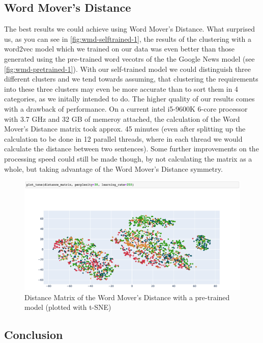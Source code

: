 \subsection{Word Mover's Distance} %
\label{sub:findings_wmd}
The best results we could achieve using Word Mover's Distance. What surprised us, as you can see in \autoref{fig:wmd-selftrained-1}, the results of the clustering with a word2vec model which we trained on our data was even better than those generated using the pre-trained word vecotrs of the the Google News model (see \autoref{fig:wmd-pretrained-1}). With our self-trained model we could distinguish three different clusters and we tend towards assuming, that clustering the requirements into these three clusters may even be more accurate than to sort them in 4 categories, as we initally intended to do.
The higher quality of our results comes with a drawback of performance. On a current intel i5-9600K 6-core processor with 3.7 GHz and 32 GB of memeroy attached, the calculation of the Word Mover's Distance matrix took approx. 45 minutes (even after splitting up the calculation to be done in 12 parallel threads, where in each thread we would calculate the distance between two sentences). Some further improvements on the processing speed could still be made though, by not calculating the matrix as a whole, but taking advantage of the Word Mover's Distance symmetry.

\begin{figure}[ht]
  \begin{center}
    \includegraphics[width=\textwidth]{screenshots/pt_word_movers_distance_tsne1.png}
    \caption{Distance Matrix of the Word Mover's Distance with a pre-trained model (plotted with t-SNE)}
    \label{fig:wmd-pretrained-1}
  \end{center}
\end{figure}

\subsection{Conclusion}

